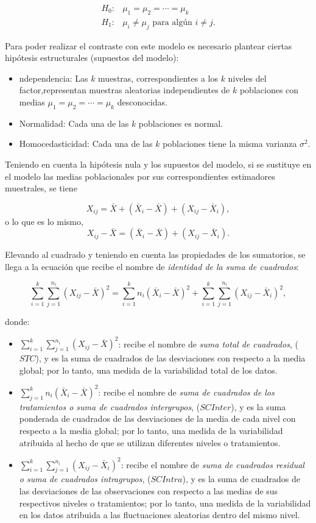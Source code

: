 \documentclass[
  a4paper,
]{scrreport}
\providecommand{\tightlist}{%
  \setlength{\itemsep}{0pt}\setlength{\parskip}{0pt}}\usepackage{longtable,booktabs,array}
\theoremstyle{plain}
\theoremstyle{definition}
\theoremstyle{definition}
\theoremstyle{remark}
\begin{document}
\begin{align*}
H_0: & \mu_1 = \mu_2  = \cdots = \mu _k\\
H_1: & \mu_i \neq \mu_j \textrm{ para algún } i\neq j.
\end{align*}

Para poder realizar el contraste con este modelo es necesario plantear
ciertas hipótesis estructurales (supuestos del modelo):

\begin{itemize}
\tightlist
\item
  ndependencia: Las \(k\) muestras, correspondientes a los \(k\) niveles
  del factor,representan muestras aleatorias independientes de \(k\)
  poblaciones con medias \(\mu_1  = \mu_2  = \cdots = \mu_k\)
  desconocidas.
\item
  Normalidad: Cada una de las \(k\) poblaciones es normal.
\item
  Homocedasticidad: Cada una de las \(k\) poblaciones tiene la misma
  varianza \(\sigma^2\).
\end{itemize}

Teniendo en cuenta la hipótesis nula y los supuestos del modelo, si se
sustituye en el modelo las medias poblacionales por sus correspondientes
estimadores muestrales, se tiene

\[
X_{ij} = \bar X+(\bar X_i-\bar X)+(X_{ij}-\bar X_i),\] o lo que es lo
mismo, \[X_{ij}-\bar X= (\bar X_i-\bar X)+(X_{ij}-\bar X_i).
\]

Elevando al cuadrado y teniendo en cuenta las propiedades de los
sumatorios, se llega a la ecuación que recibe el nombre de
\emph{identidad de la suma de cuadrados}:

\[
\sum_{i=1}^k \sum_{j=1}^{n_i} (X_{ij}-\bar X)^2  = \sum_{i=1}^k n_i(\bar X_i-\bar X)^2 +\sum_{i=1}^k \sum_{j = 1}^{n_i}(X_{ij}-\bar X_i)^2,
\]

donde:

\begin{itemize}
\tightlist
\item
  \(\sum_{i=1}^k \sum_{j=1}^{n_i} (X_{ij}- \bar X)^2\): recibe el nombre
  de \emph{suma total de cuadrados}, (\(STC\)), y es la suma de
  cuadrados de las desviaciones con respecto a la media global; por lo
  tanto, una medida de la variabilidad total de los datos.
\item
  \(\sum_{j=1}^k n_i(\bar X_i-\bar X)^2\): recibe el nombre de
  \emph{suma de cuadrados de los tratamientos o suma de cuadrados
  intergrupos}, (\(SCInter\)), y es la suma ponderada de cuadrados de
  las desviaciones de la media de cada nivel con respecto a la media
  global; por lo tanto, una medida de la variabilidad atribuida al hecho
  de que se utilizan diferentes niveles o tratamientos.
\item
  \(\sum_{i=1}^k \sum_{j=1}^{n_i}(X_{ij}-\bar X_i )^2\): recibe el
  nombre de \emph{suma de cuadrados residual o suma de cuadrados
  intragrupos}, (\(SCIntra\)), y es la suma de cuadrados de las
  desviaciones de las observaciones con respecto a las medias de sus
  respectivos niveles o tratamientos; por lo tanto, una medida de la
  variabilidad en los datos atribuida a las fluctuaciones aleatorias
  dentro del mismo nivel.
\end{itemize}
\end{document}
